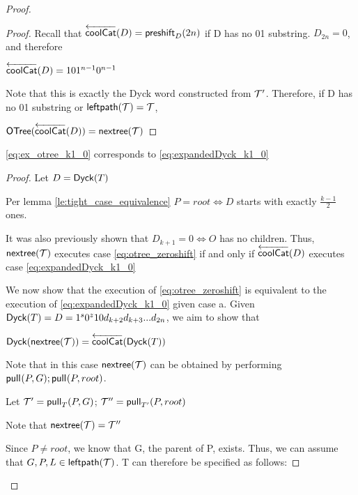 \begin{proof}
\begin{proof}
    Recall that $\coolCat{D}=\preshift{D}{2n}$ if D has no 01 substring. $D_{2n}=0$, and therefore 

    $\coolCat{D}=101^{n-1}0^{n-1}$
     
     Note that this is exactly the Dyck word constructed from $\tree{T}'$.  Therefore, if D has no 01 substring or $\leftdown{T}=\tree{T}$, 

     $\otree{\coolCat{D}}=\nextTree{T}$

\end{proof}
\begin{lemma}
    \ref{eq:ex_otree_k1_0} corresponds to \ref{eq:expandedDyck_k1_0}
\end{lemma}
\begin{proof}
    Let $D=\dyck{T}$

    Per lemma \ref{le:tight_case_equivalence} $P=root \iff D$ starts with exactly $\frac{k-1}{2}$ ones.  

    It was also previously shown that $D_{k+1}=0 \iff O$ has no children.  
    Thus, $\nextTree{T}$ executes case \ref{eq:otree_zeroshift} 
    if and only if $\coolCat{D}$ executes case   \ref{eq:expandedDyck_k1_0}

    \bigskip

    We now show that the execution of \ref{eq:otree_zeroshift} is equivalent to the execution of \ref{eq:expandedDyck_k1_0} given case a.
    Given $\dyck{T}=D=1^s0^{z}10d_{k+2}d_{k+3}...d_{2n}$, we aim to show that 

    $\dyck{\nextTree{T}}=\coolCat{\dyck{T}}$
    \bigskip

    Note that in this case $\nextTree{T}$ can be obtained by performing $\poppush{P}{G};\poppush{P}{root}$. 

	    Let $\tree{T}'=\poppush[T]{P}{G}$; $\tree{T}''=\poppush[T']{P}{root}$

	    Note that $\nextTree{T}=\tree{T}''$

    Since $P \ne root$, we know that G, the parent of P, exists. 
    Thus, we can assume that $G,P,L \in \leftdown{T}$.  T can therefore be specified as follows: 





\end{proof}
\end{proof}
